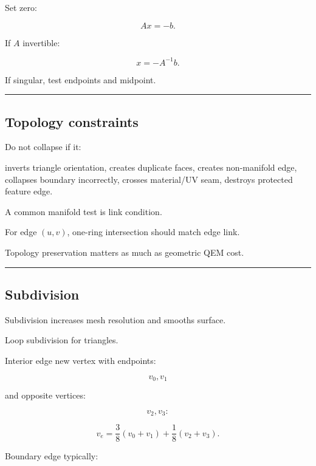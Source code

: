 Set zero:

\[
\boxed{
Ax=-b.
}
\]

If \(A\) invertible:

\[
x=-A^{-1}b.
\]

If singular, test endpoints and midpoint.

\begin{center}\rule{0.5\linewidth}{0.5pt}\end{center}

\subsection{Topology constraints}\label{04-visual-computing-ii-ch041-topology-constraints}

\hypertarget{04-visual-computing-ii-ch041-topology-constraints}{}

Do not collapse if it:

inverts triangle orientation, creates duplicate faces, creates non-manifold edge, collapses boundary incorrectly, crosses material/UV seam, destroys protected feature edge.

A common manifold test is link condition.

For edge \((u,v)\), one-ring intersection should match edge link.

Topology preservation matters as much as geometric QEM cost.

\begin{center}\rule{0.5\linewidth}{0.5pt}\end{center}

\subsection{Subdivision}\label{04-visual-computing-ii-ch041-subdivision}

\hypertarget{04-visual-computing-ii-ch041-subdivision}{}

Subdivision increases mesh resolution and smooths surface.

Loop subdivision for triangles.

Interior edge new vertex with endpoints:

\[
v_0,v_1
\]

and opposite vertices:

\[
v_2,v_3:
\]

\[
\boxed{
v_e
=
\frac38(v_0+v_1)
+
\frac18(v_2+v_3).
}
\]

Boundary edge typically:

